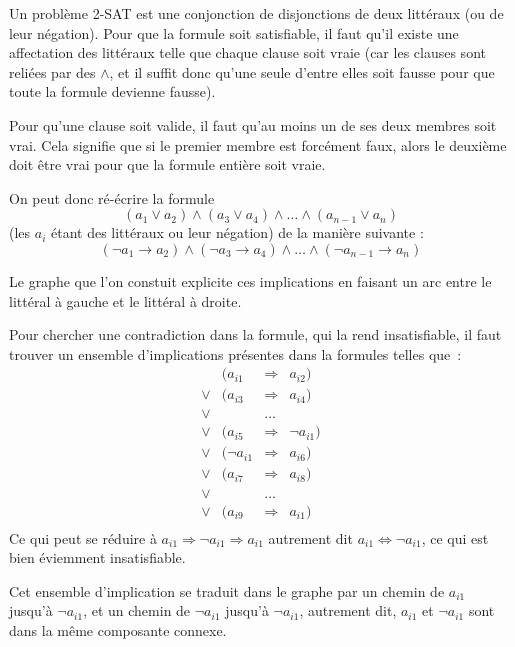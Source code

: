 \documentclass{article}
\begin{document}
Un problème 2-SAT est une conjonction de disjonctions de deux littéraux (ou de leur négation). Pour que la formule soit satisfiable, il faut
qu'il existe une affectation des littéraux telle que chaque clause soit vraie (car les clauses sont reliées par des $\wedge$, et il suffit
donc qu'une seule d'entre elles soit fausse pour que toute la formule devienne fausse).

Pour qu'une clause soit valide, il faut qu'au moins un de ses deux membres soit vrai. Cela signifie que si le premier membre est forcément
faux, alors le deuxième doit être vrai pour que la formule entière soit vraie.

On peut donc ré-écrire la formule
$$(a_1 \vee a_2) \wedge (a_3 \vee a_4) \wedge \dots \wedge (a_{n-1} \vee a_n)$$
(les $a_i$ étant des littéraux ou leur négation) de la manière suivante :
$$(\lnot a_1 \rightarrow a_2) \wedge (\lnot a_3 \rightarrow a_4) \wedge \dots \wedge (\lnot a_{n-1} \rightarrow a_n)$$

Le graphe que l'on constuit explicite ces implications en faisant un arc entre le littéral à gauche et le littéral à droite.

Pour chercher une contradiction dans la formule, qui la rend insatisfiable, il faut trouver un ensemble d'implications présentes dans la
formules telles que~:
$$
\begin{array}{rrcl}
       & (a_{i1} & \Rightarrow & a_{i2}) \\
  \vee & (a_{i3} & \Rightarrow & a_{i4}) \\
  \vee & & \dots & \\
  \vee & (a_{i5} & \Rightarrow & \lnot a_{i1}) \\
  \vee & (\lnot a_{i1} & \Rightarrow & a_{i6}) \\
  \vee & (a_{i7} & \Rightarrow & a_{i8}) \\
  \vee & & \dots & \\
  \vee & (a_{i9} & \Rightarrow & a_{i1}) \\
\end{array}
$$
Ce qui peut se réduire à $a_{i1} \Rightarrow \lnot a_{i1} \Rightarrow a_{i1}$ autrement dit $a_{i1} \Leftrightarrow \lnot a_{i1}$, ce qui
est bien éviemment insatisfiable.

Cet ensemble d'implication se traduit dans le graphe par un chemin de $a_{i1}$ jusqu'à $\lnot a_{i1}$, et un chemin de $\lnot a_{i1}$
jusqu'à $\lnot a_{i1}$, autrement dit, $a_{i1}$ et $\lnot a_{i1}$ sont dans la même composante connexe.

\end{document}
